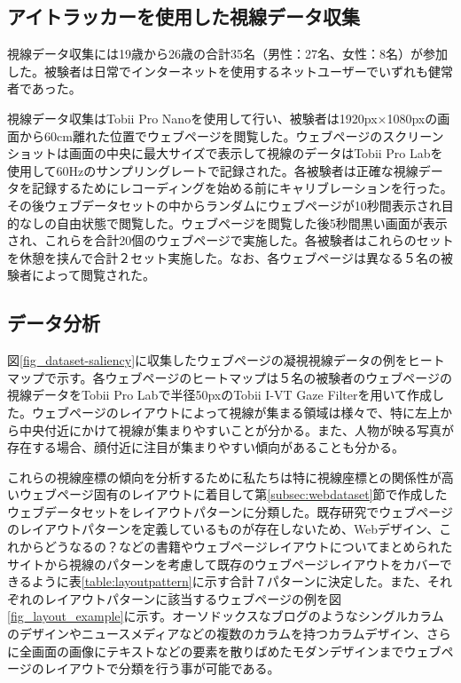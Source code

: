 \subsection{アイトラッカーを使用した視線データ収集}\label{subsec:gazedataset}
\par 視線データ収集には19歳から26歳の合計35名（男性：27名、女性：8名）が参加した。被験者は日常でインターネットを使用するネットユーザーでいずれも健常者であった。

\par 視線データ収集はTobii Pro Nano\cite{tobiipronano}を使用して行い、被験者は1920px×1080pxの画面から60cm離れた位置でウェブページを閲覧した。ウェブページのスクリーンショットは画面の中央に最大サイズで表示して視線のデータはTobii Pro Lab\cite{tobiiprolabo}を使用して60Hzのサンプリングレートで記録された。各被験者は正確な視線データを記録するためにレコーディングを始める前にキャリブレーションを行った。その後ウェブデータセットの中からランダムにウェブページが10秒間表示され目的なしの自由状態で閲覧した。ウェブページを閲覧した後5秒間黒い画面が表示され、これらを合計20個のウェブページで実施した。各被験者はこれらのセットを休憩を挟んで合計２セット実施した。なお、各ウェブページは異なる５名の被験者によって閲覧された。


\subsection{データ分析}\label{subsec:gazeanalysis}
\par 図\ref{fig_dataset-saliency}に収集したウェブページの凝視視線データの例をヒートマップで示す。各ウェブページのヒートマップは５名の被験者のウェブページの視線データをTobii Pro Labで半径50pxのTobii I-VT Gaze Filterを用いて作成した。ウェブページのレイアウトによって視線が集まる領域は様々で、特に左上から中央付近にかけて視線が集まりやすいことが分かる。また、人物が映る写真が存在する場合、顔付近に注目が集まりやすい傾向があることも分かる。

\par これらの視線座標の傾向を分析するために私たちは特に視線座標との関係性が高いウェブページ固有のレイアウトに着目して第\ref{subsec:webdataset}節で作成したウェブデータセットをレイアウトパターンに分類した。既存研究でウェブページのレイアウトパターンを定義しているものが存在しないため、Webデザイン、これからどうなるの？\cite{bookwebdesign}などの書籍やウェブページレイアウトについてまとめられたサイトから視線のパターンを考慮して既存のウェブページレイアウトをカバーできるように表\ref{table:layoutpattern}に示す合計７パターンに決定した。また、それぞれのレイアウトパターンに該当するウェブページの例を図\ref{fig_layout_example}に示す。オーソドックスなブログのようなシングルカラムのデザインやニュースメディアなどの複数のカラムを持つカラムデザイン、さらに全画面の画像にテキストなどの要素を散りばめたモダンデザインまでウェブページのレイアウトで分類を行う事が可能である。

